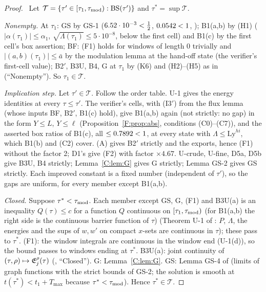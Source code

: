 \documentclass[11pt]{article}
\begin{document}
\begin{proof}\tHd\ Let $\mathcal T=\{\tau'\in[\tau_1,\tau_{\rm mod}):\mathrm{BS}(\tau')\}$ and $\tau^*=\sup\mathcal T$.

\emph{Nonempty.} At $\tau_1$: GS by GS-1 ($6.52\cdot10^{-3}<\frac12$, $0.0542<1$, ); B1(a,b) by (H1) ($|\alpha(\tau_1)|\le\alpha_1$, $\sqrt{\Lambda(\tau_1)}\le5\cdot10^{-8}$, below the first cell) and B1(c) by the first cell's box assertion; BF: (F1) holds for windows of length $0$ trivially and $|(a,b)(\tau_1)|\le\bar a$ by the modulation lemma at the hand-off state (the verifier's first-cell value); B2$'$, B3U, B4, G at $\tau_1$ by (K6) and (H2)--(H5) as in  (``Nonempty''). So $\tau_1\in\mathcal T$.

\emph{Implication step.} Let $\tau'\in\mathcal T$. Follow the order table. U-1 gives the energy identities at every $\tau\le\tau'$. The verifier's cells, with (I3$'$) from the flux lemma (whose inputs BF, B2$'$, B1(c) hold), give B1(a,b) again (not strictly: no gap) in the form $Y\le L$, $Y\le\ell$ (Proposition~\ref{F:prop:abs}, conditions (C0)--(C7)), and the asserted box ratios of B1(c), all $\le0.7892<1$, at every state with $\Lambda\le\mathrm{Ly}^{hi}$, which B1(b) and (C2) cover. (A) gives B2$'$ strictly and the exports, hence (F1) without the factor 2; D1's  give (F2) with factor $\times4.67$. U-crude, U-fine, D5a, D5b give B3U, B4 strictly; Lemma~\ref{C:lem:G} gives G strictly; Lemma GS-2 gives GS strictly. Each improved constant is a fixed number (independent of $\tau'$), so the gaps are uniform, for every member except B1(a,b).

\emph{Closed.} Suppose $\tau^*<\tau_{\rm mod}$. Each member except GS, G, (F1) and B3U(a) is an inequality $Q(\tau)\le c$ for a function $Q$ continuous on $[\tau_1,\tau_{\rm mod})$ (for B1(a,b) the right side is the continuous barrier function of $\tau$) (Theorem U-1 of : $P$, $\Lambda$, the energies and the sups of $w,w'$ on compact $x$-sets are continuous in $\tau$); these pass to $\tau^*$. (F1): the window integrals are continuous in the window end (U-1(d)), so the bound passes to windows ending at $\tau^*$. B3U(a): joint continuity of $(\tau,\rho)\mapsto\mathfrak E^\rho_j(\tau)$ (, ``Closed''). G: Lemma~\ref{C:lem:G}. GS: Lemma GS-4 of  (limits of graph functions with the strict bounds of GS-2; the solution is smooth at $t(\tau^*)<t_1+T_{\max}$ because $\tau^*<\tau_{\rm mod}$). Hence $\tau^*\in\mathcal T$.


\end{proof}
\end{document}
